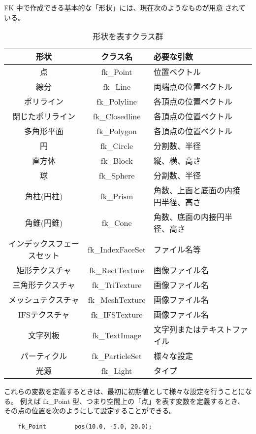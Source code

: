 FK 中で作成できる基本的な「形状」には、現在次のようなものが用意
されている。
\begin{table}[H]
\caption{形状を表すクラス群}
\label{tbl:shapeclass}
\begin{small}
\begin{center}
\begin{tabular}{|c|c|l|}
\hline
形状 & クラス名 & 必要な引数 \\ \hline \hline
点 & fk\_Point & 位置ベクトル \\ \hline
線分 & fk\_Line & 両端点の位置ベクトル \\ \hline
ポリライン & fk\_Polyline & 各頂点の位置ベクトル \\ \hline
閉じたポリライン & fk\_Closedline & 各頂点の位置ベクトル \\ \hline
多角形平面 & fk\_Polygon & 各頂点の位置ベクトル \\ \hline
円 & fk\_Circle & 分割数、半径 \\ \hline
直方体 & fk\_Block & 縦、横、高さ \\ \hline
球 & fk\_Sphere & 分割数、半径 \\ \hline
角柱(円柱) & fk\_Prism & 角数、上面と底面の内接円半径、高さ \\ \hline
角錐(円錐) & fk\_Cone & 角数、底面の内接円半径、高さ \\ \hline
インデックスフェースセット & fk\_IndexFaceSet & ファイル名等 \\ \hline
矩形テクスチャ & fk\_RectTexture & 画像ファイル名 \\ \hline
三角形テクスチャ & fk\_TriTexture & 画像ファイル名 \\ \hline
メッシュテクスチャ & fk\_MeshTexture & 画像ファイル名 \\ \hline
IFSテクスチャ & fk\_IFSTexture & 画像ファイル名 \\ \hline
文字列板 & fk\_TextImage & 文字列またはテキストファイル \\ \hline
パーティクル & fk\_ParticleSet & 様々な設定 \\ \hline
光源 & fk\_Light & タイプ \\ \hline
\end{tabular}
\end{center}
\end{small}
\end{table}

これらの変数を定義するときは、最初に初期値として様々な設定を行うことになる。
例えば fk\_Point 型、つまり空間上の「点」を表す変数を定義するとき、
その点の位置を次のようにして設定することができる。
\\
\begin{screen}
\begin{verbatim}
    fk_Point        pos(10.0, -5.0, 20.0);
\end{verbatim}
\end{screen}
\\

